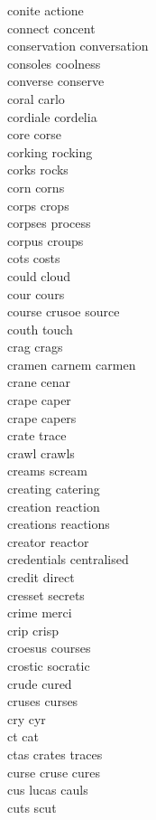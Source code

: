 conite actione \\
connect concent\\
conservation conversation\\
consoles coolness\\
converse conserve\\
coral carlo\\
cordiale cordelia\\
core corse \\
corking rocking\\
corks rocks\\
corn corns \\
corps crops\\
corpses process\\
corpus croups\\
cots costs \\
could cloud\\
cour cours \\
course crusoe source\\
couth touch\\
crag crags \\
cramen carnem carmen\\
crane cenar\\
crape caper\\
crape capers \\
crate trace\\
crawl crawls \\
creams scream\\
creating catering\\
creation reaction\\
creations reactions\\
creator reactor\\
credentials centralised\\
credit direct\\
cresset secrets\\
crime merci\\
crip crisp \\
croesus courses\\
crostic socratic \\
crude cured\\
cruses curses\\
cry cyr\\
ct cat \\
ctas crates traces  \\
curse cruse cures\\
cus lucas cauls  \\
cuts scut\\


